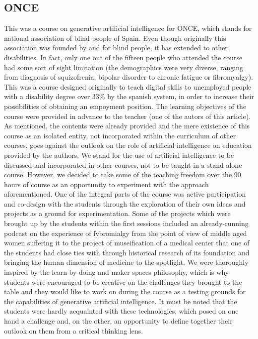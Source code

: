 \documentclass{article}
\begin{document}
\subsection{ONCE}
This was a course on generative artificial intelligence for ONCE, which stands for national association of blind people of Spain. Even though originally this association was founded by and for blind people, it has extended to other disabilities. In fact, only one out of the fifteen people who attended the course had some sort of sight limitation (the demographics were very diverse, ranging from diagnosis of squizofrenia, bipolar disorder to chronic fatigue or fibromyalgy). This was a course designed originally to teach digital skills to unemployed people with a disability degree over 33\% by the spanish system, in order to increase their possibilities of obtaining an empoyment position. The learning objectives of the course were provided in advance to the teacher (one of the autors of this article). As mentioned, the contents were already provided and the mere existence of this course as an isolated entity, not incorporated within the curriculum of other courses, goes against the outlook on the role of artificial intelligence on education provided by the authors. We stand for the use of artificial intelligence to be discussed and incorporated in other courses, not to be taught in a stand-alone course. However, we decided to take some of the teaching freedom over the 90 hours of course as an opportunity to experiment with the approach aforementioned. One of the integral parts of the course was active participation and co-design with the students through the exploration of their own ideas and projects as a ground for experimentation. Some of the projects which were brought up by the students within the first sessions included an already-running podcast on the experience of fybromialgy from the point of view of middle aged women suffering it to the project of museification of a medical center that one of the students had close ties with through historical research of its foundation and bringing the human dimension of medicine to the spotlight. We were thoroughly inspired by the learn-by-doing and maker spaces philosophy, which is why students were encouraged to be creative on the challenges they brought to the table and they would like to work on during the course as a testing grounds for the capabilities of generative artificial intelligence. It must be noted that the students were hardly acquainted with these technologies; which posed on one hand a challenge and, on the other, an opportunity to define together their outlook on them from a critical thinking lens.\\
\end{document}
